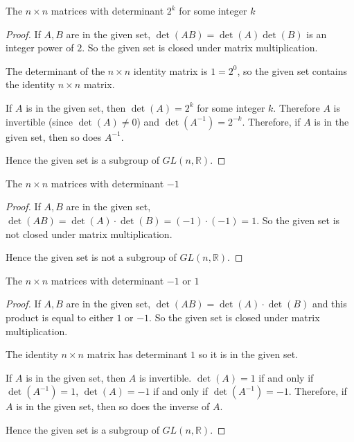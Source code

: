\newpage
\begin{exercise}
    The $n\times n$ matrices with determinant $2^{k}$ for some integer $k$
\end{exercise}

\begin{proof}
    If $A, B$ are in the given set, $\det(AB) = \det(A)\det(B)$ is an integer power of $2$. So the given set is closed under matrix multiplication.

    The determinant of the $n\times n$ identity matrix is $1 = 2^{0}$, so the given set contains the identity $n\times n$ matrix.

    If $A$ is in the given set, then $\det(A) = 2^{k}$ for some integer $k$. Therefore $A$ is invertible (since $\det(A)\ne 0$) and $\det(A^{-1}) = 2^{-k}$. Therefore, if $A$ is in the given set, then so does $A^{-1}$.

    Hence the given set is a subgroup of $GL(n, \mathbb{R})$.
\end{proof}

\newpage
\begin{exercise}
    The $n\times n$ matrices with determinant $-1$
\end{exercise}

\begin{proof}
    If $A, B$ are in the given set, $\det(AB) = \det(A)\cdot\det(B) = (-1)\cdot (-1) = 1$. So the given set is not closed under matrix multiplication.

    Hence the given set is not a subgroup of $GL(n, \mathbb{R})$.
\end{proof}

\newpage
\begin{exercise}
    The $n\times n$ matrices with determinant $-1$ or $1$
\end{exercise}

\begin{proof}
    If $A, B$ are in the given set, $\det(AB) = \det(A)\cdot\det(B)$ and this product is equal to either $1$ or $-1$. So the given set is closed under matrix multiplication.

    The identity $n\times n$ matrix has determinant $1$ so it is in the given set.

    If $A$ is in the given set, then $A$ is invertible. $\det(A) = 1$ if and only if $\det(A^{-1}) = 1$, $\det(A) = -1$ if and only if $\det(A^{-1}) = -1$. Therefore, if $A$ is in the given set, then so does the inverse of $A$.

    Hence the given set is a subgroup of $GL(n, \mathbb{R})$.
\end{proof}

